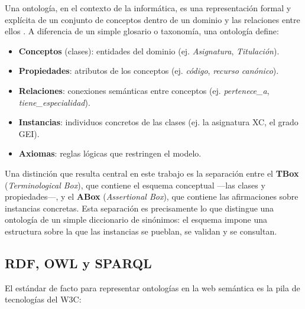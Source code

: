 \documentclass[12pt, a4paper, twoside]{report}
\begin{document}
Una ontolog\'ia, en el contexto de la inform\'atica, es una representaci\'on formal y expl\'icita de un conjunto de conceptos dentro de un dominio y las relaciones entre ellos \cite{gruber1993}. A diferencia de un simple glosario o taxonom\'ia, una ontolog\'ia define:

\begin{itemize}
  \item \textbf{Conceptos} (clases): entidades del dominio (ej. \textit{Asignatura}, \textit{Titulaci\'on}).
  \item \textbf{Propiedades}: atributos de los conceptos (ej. \textit{c\'odigo}, \textit{recurso can\'onico}).
  \item \textbf{Relaciones}: conexiones sem\'anticas entre conceptos (ej. \textit{pertenece\_a}, \textit{tiene\_especialidad}).
  \item \textbf{Instancias}: individuos concretos de las clases (ej. la asignatura XC, el grado GEI).
  \item \textbf{Axiomas}: reglas l\'ogicas que restringen el modelo.
\end{itemize}

Una distinci\'on que resulta central en este trabajo es la separaci\'on entre el \textbf{TBox} (\textit{Terminological Box}), que contiene el esquema conceptual ---las clases y propiedades---, y el \textbf{ABox} (\textit{Assertional Box}), que contiene las afirmaciones sobre instancias concretas. Esta separaci\'on es precisamente lo que distingue una ontolog\'ia de un simple diccionario de sin\'onimos: el esquema impone una estructura sobre la que las instancias se pueblan, se validan y se consultan.

\subsection{RDF, OWL y SPARQL}

El est\'andar de facto para representar ontolog\'ias en la web sem\'antica es la pila de tecnolog\'ias del W3C:
\end{document}
